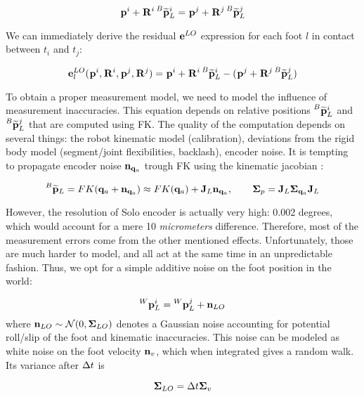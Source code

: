 \begin{equation}
    \prescript{}{}{{\bf p}}_{}^i + \prescript{}{}{{\bf R}}_{}^i \prescript{B}{}{\widetilde{{\bf p}}}_{L}^i = \prescript{}{}{{\bf p}}_{}^j + \prescript{}{}{{\bf R}}_{}^j \prescript{B}{}{\widetilde{{\bf p}}}_{L}^j
\end{equation}

We can immediately derive the residual ${\bf e}^{LO}$ expression for each foot $l$ in contact between $t_i$ and $t_j$:

\begin{equation}
    {\bf e}^{LO}_l(\prescript{}{}{{\bf p}}_{}^i, \prescript{}{}{{\bf R}}_{}^i, \prescript{}{}{{\bf p}}_{}^j, \prescript{}{}{{\bf R}}_{}^j) = \prescript{}{}{{\bf p}}_{}^i + \prescript{}{}{{\bf R}}_{}^i \prescript{B}{}{\widetilde{{\bf p}}}_{L}^i - (\prescript{}{}{{\bf p}}_{}^j + \prescript{}{}{{\bf R}}_{}^j \prescript{B}{}{\widetilde{{\bf p}}}_{L}^j)
\end{equation}

To obtain a proper measurement model, we need to model the influence of measurement inaccuracies.
This equation depends on relative positions $\prescript{B}{}{\widetilde{{\bf p}}}_{L}^i$ and $\prescript{B}{}{\widetilde{{\bf p}}}_{L}^j$ that are computed using FK. The quality of the computation depends on several things:
the robot kinematic model (calibration), deviations from the rigid body model (\eg segment/joint flexibilities, backlash), encoder noise.
It is tempting to propagate encoder noise ${\bf n}_{{\bf q}_a}$ trough FK using the kinematic jacobian \cite{bloesch2013state, hartley2018legged}:

\begin{equation}
    \prescript{B}{}{\widetilde{{\bf p}}}_{L} = FK({\bf q}_a + {\bf n}_{{\bf q}_a}) \approx FK({\bf q}_a) + {\bf J}_L{\bf n}_{{\bf q}_a}, \quad \quad {\bm \Sigma}_{p} = {\bf J}_L {\bm \Sigma}_{{\bf q}_a} {\bf J}_L
\end{equation}

However, the resolution of Solo encoder is actually very high: 0.002 degrees, which would account for a mere 10 \textit{micrometers} difference.
Therefore, most of the measurement errors come from the other mentioned effects. Unfortunately, those are much harder to model, and all act at the same time
in an unpredictable fashion. Thus, we opt for a simple additive noise on the foot position in the world:

\begin{equation}
    \prescript{W}{}{{\bf p}}_{L}^i = \prescript{W}{}{{\bf p}}_{L}^j + {\bf n}_{LO}
\end{equation}
%
where ${\bf n}_{LO} \sim \mathcal{N}({0},{{\bm \Sigma}_{LO}})$ denotes a Gaussian noise accounting for potential roll/slip of the foot and kinematic inaccuracies.
This noise can be modeled as white noise on the foot velocity ${\bf n}_v$, which when integrated gives a random walk.  
Its variance after $\Delta t$ is 

\begin{equation}
    {\bm \Sigma}_{LO} = \Delta t {\bm \Sigma}_v
\end{equation}

